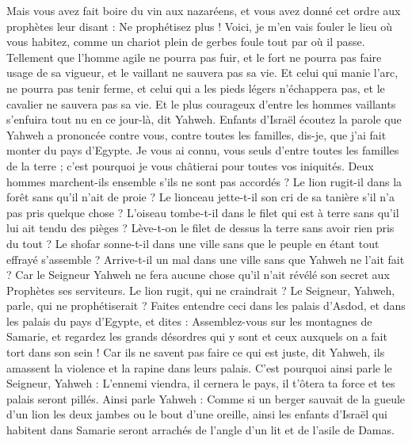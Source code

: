 \begin{multicols}{2}
Mais vous avez fait boire du vin aux nazaréens, et vous avez donné cet ordre aux prophètes leur disant : Ne prophétisez plus !
Voici, je m'en vais fouler le lieu où vous habitez, comme un chariot plein de gerbes foule tout par où il passe.
Tellement que l'homme agile ne pourra pas fuir, et le fort ne pourra pas faire usage de sa vigueur, et le vaillant ne sauvera pas sa vie.
Et celui qui manie l'arc, ne pourra pas tenir ferme, et celui qui a les pieds légers n'échappera pas, et le cavalier ne sauvera pas sa vie.
Et le plus courageux d'entre les hommes vaillants s'enfuira tout nu en ce jour-là, dit Yahweh.
\VerseOne{}Enfants d'Israël écoutez la parole que Yahweh a prononcée contre vous, contre toutes les familles, dis-je, que j'ai fait monter du pays d'Egypte.
Je vous ai connu, vous seuls d'entre toutes les familles de la terre ; c'est pourquoi je vous châtierai pour toutes vos iniquités.
Deux hommes marchent-ils ensemble s'ils ne sont pas accordés ?
  Le lion rugit-il dans la forêt sans qu'il n'ait de proie ? Le lionceau jette-t-il son cri de sa tanière s'il n'a pas pris quelque chose ?
L'oiseau tombe-t-il dans le filet qui est à terre sans qu'il lui ait tendu des pièges ? Lève-t-on le filet de dessus la terre sans avoir rien pris du tout ?
Le shofar sonne-t-il dans une ville sans que le peuple en étant tout effrayé s'assemble ? Arrive-t-il un mal dans une ville sans que Yahweh ne l'ait fait ?
Car le Seigneur Yahweh ne fera aucune chose qu'il n'ait révélé son secret aux Prophètes ses serviteurs. 
Le lion rugit, qui ne craindrait ? Le Seigneur, Yahweh, parle, qui ne prophétiserait ?
Faites entendre ceci dans les palais d'Asdod, et dans les palais du pays d'Egypte, et dites : Assemblez-vous sur les montagnes de Samarie, et regardez les grands désordres qui y sont et ceux auxquels on a fait tort dans son sein !
Car ils ne savent pas faire ce qui est juste, dit Yahweh, ils amassent la violence et la rapine dans leurs palais.
C'est pourquoi ainsi parle le Seigneur, Yahweh : L'ennemi viendra, il cernera le pays, il t'ôtera ta force et tes palais seront pillés.
Ainsi parle Yahweh : Comme si un berger sauvait de la gueule d'un lion les deux jambes ou le bout d'une oreille, ainsi les enfants d'Israël qui habitent dans Samarie seront arrachés de l'angle d'un lit et de l'asile de Damas.

\end{multicols}

